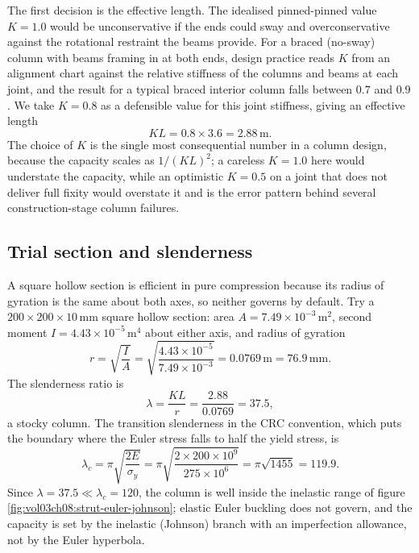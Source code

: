 The first decision is the effective length. The idealised pinned-pinned
value $K = 1.0$ would be unconservative if the ends could sway and
overconservative against the rotational restraint the beams provide. For
a braced (no-sway) column with beams framing in at both ends, design
practice reads $K$ from an alignment chart against the relative
stiffness of the columns and beams at each joint, and the result for a
typical braced interior column falls between $0.7$ and $0.9$. We take
$K = 0.8$ as a defensible value for this joint stiffness, giving an
effective length
\[
KL = 0.8 \times 3.6 = 2.88\,\si{\meter}.
\]
The choice of $K$ is the single most consequential number in a column
design, because the capacity scales as $1/(KL)^2$; a careless $K = 1.0$
here would understate the capacity, while an optimistic $K = 0.5$ on a
joint that does not deliver full fixity would overstate it and is the
error pattern behind several construction-stage column failures.

\subsection{Trial section and slenderness}

A square hollow section is efficient in pure compression because its
radius of gyration is the same about both axes, so neither governs by
default. Try a $200 \times 200 \times 10\,\si{\milli\meter}$ square
hollow section: area $A = 7.49 \times 10^{-3}\,\si{\meter\squared}$,
second moment $I = 4.43 \times 10^{-5}\,\si{\meter\tothe{4}}$ about
either axis, and radius of gyration
\[
r = \sqrt{\frac{I}{A}} = \sqrt{\frac{4.43 \times 10^{-5}}{7.49 \times
10^{-3}}} = 0.0769\,\si{\meter} = 76.9\,\si{\milli\meter}.
\]
The slenderness ratio is
\[
\lambda = \frac{KL}{r} = \frac{2.88}{0.0769} = 37.5,
\]
a stocky column. The transition slenderness in the CRC convention,
which puts the boundary where the Euler stress falls to half the yield
stress, is
\[
\lambda_c = \pi\sqrt{\frac{2E}{\sigma_y}}
= \pi\sqrt{\frac{2 \times 200 \times 10^9}{275 \times 10^6}}
= \pi\sqrt{1455} = 119.9.
\]
Since $\lambda = 37.5 \ll \lambda_c = 120$, the column is well inside
the inelastic range of figure \ref{fig:vol03ch08:strut-euler-johnson};
elastic Euler buckling does not govern, and the capacity is set by the
inelastic (Johnson) branch with an imperfection allowance, not by the
Euler hyperbola.



